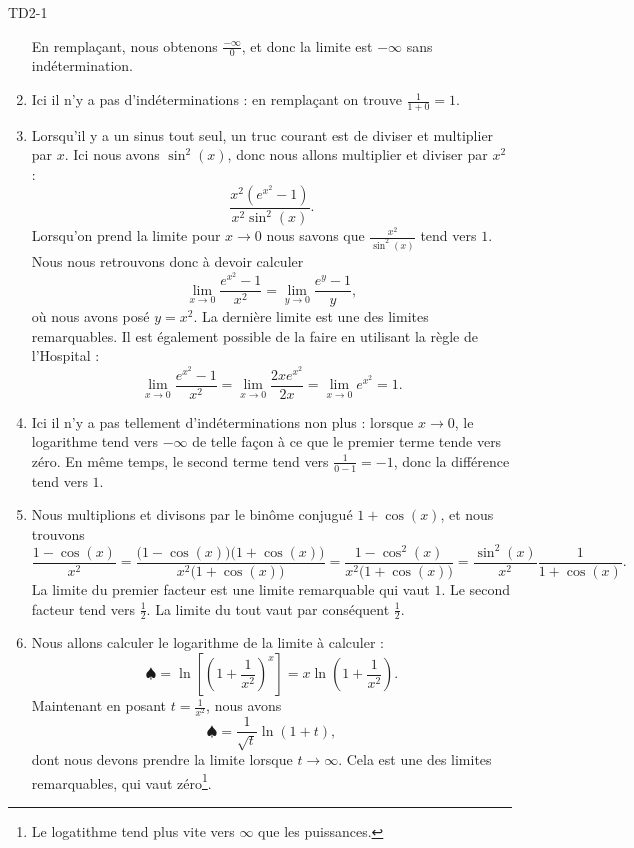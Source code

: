 \begin{corrige}{TD2-1}
\begin{enumerate}
			En remplaçant, nous obtenons $\frac{ -\infty }{  0}$, et donc la limite est $-\infty$ sans indétermination.
		\item
			Ici il n'y a pas d'indéterminations : en remplaçant on trouve $\frac{ 1 }{ 1+0 }=1$.
		\item
			Lorsqu'il y a un sinus tout seul, un truc courant est de diviser et multiplier par $x$. Ici nous avons $\sin^2(x)$, donc nous allons multiplier et diviser par $x^2$ :
			\begin{equation}
				\frac{ x^2( e^{x^2}-1) }{ x^2\sin^2(x) }.
			\end{equation}
			Lorsqu'on prend la limite pour $x\to 0$ nous savons que $\frac{ x^2 }{ \sin^2(x) }$ tend vers $1$. Nous nous retrouvons donc à devoir calculer
			\begin{equation}
				\lim_{x\to 0} \frac{  e^{x^2}-1 }{ x^2 }=\lim_{y\to 0}\frac{ e^y-1 }{ y }, 
			\end{equation}
			où nous avons posé $y=x^2$. La dernière limite est une des limites remarquables. Il est également possible de la faire en utilisant la règle de l'Hospital :
            \begin{equation}
                \lim_{x\to 0} \frac{  e^{x^2}-1 }{ x^2 }=\lim_{x\to 0} \frac{ 2x e^{x^2} }{ 2x }=\lim_{x\to 0}  e^{x^2}=1.
            \end{equation}
		\item
			Ici il n'y a pas tellement d'indéterminations non plus : lorsque $x\to 0$, le logarithme tend vers $-\infty$ de telle façon à ce que le premier terme tende vers zéro. En même temps, le second terme tend vers $\frac{1}{ 0-1 }=-1$, donc la différence tend vers $1$.
		\item
			Nous multiplions et divisons par le binôme conjugué $1+\cos(x)$, et nous trouvons
			\begin{equation}
                \frac{ 1-\cos(x) }{ x^2 }=\frac{ \big( 1-\cos(x) \big)\big( 1+\cos(x) \big) }{ x^2\big( 1+\cos(x) \big) }=\frac{ 1-\cos^2(x) }{ x^2\big( 1+\cos(x) \big) }=\frac{ \sin^2(x) }{ x^2 }\frac{1}{ 1+\cos(x) }.
			\end{equation}
            La limite du premier facteur est une limite remarquable qui vaut \( 1\). Le second facteur tend vers \( \frac{ 1 }{2}\). La limite du tout vaut par conséquent \( \frac{ 1 }{2}\).
		\item
			Nous allons calculer le logarithme de la limite à calculer :
            \begin{equation}        \label{EqBtkUpe}
				\spadesuit=\ln\left[ \left( 1+\frac{1}{ x^2 } \right)^x \right]=x\ln\left( 1+\frac{1}{ x^2 } \right).
			\end{equation}
			Maintenant en posant $t=\frac{1}{ x^2 }$, nous avons
			\begin{equation}
				\spadesuit=\frac{1}{ \sqrt{t} }\ln(1+t),
			\end{equation}
            dont nous devons prendre la limite lorsque $t\to \infty$. Cela est une des limites remarquables, qui vaut zéro\footnote{Le logatithme tend plus vite vers \( \infty\) que les puissances.}.


\end{enumerate}
\end{corrige}
